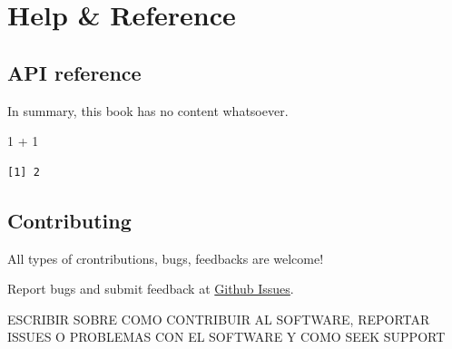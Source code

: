 \documentclass[
  letterpaper,
  DIV=11,
  numbers=noendperiod]{scrreprt}
\newenvironment{Shaded}{\begin{snugshade}}{\end{snugshade}}
\newcommand{\DecValTok}[1]{\textcolor[rgb]{0.68,0.00,0.00}{#1}}
\newcommand{\SpecialCharTok}[1]{\textcolor[rgb]{0.37,0.37,0.37}{#1}}
\begin{document}

\part{Help \& Reference}

\hypertarget{api-reference}{%
\chapter*{API reference}\label{api-reference}}


In summary, this book has no content whatsoever.

\begin{Shaded}
\begin{Highlighting}[]
\DecValTok{1} \SpecialCharTok{+} \DecValTok{1}
\end{Highlighting}
\end{Shaded}

\begin{verbatim}
[1] 2
\end{verbatim}

\hypertarget{contributing}{%
\chapter*{Contributing}\label{contributing}}


All types of crontributions, bugs, feedbacks are welcome!

Report bugs and submit feedback at
\href{https://github.com/fiorelacl/SCAHpy/issues}{Github Issues}.

ESCRIBIR SOBRE COMO CONTRIBUIR AL SOFTWARE, REPORTAR ISSUES O PROBLEMAS
CON EL SOFTWARE Y COMO SEEK SUPPORT
\end{document}
